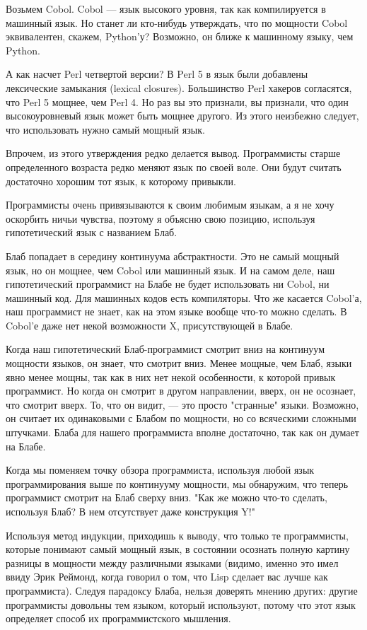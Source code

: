 \documentclass[ebook,12pt,oneside,openany]{memoir}
\begin{document}
Возьмем Cobol. Cobol — язык высокого уровня, так как компилируется в
машинный язык. Но станет ли кто-нибудь утверждать, что по мощности
Cobol эквивалентен, скажем, Python'у? Возможно, он ближе к машинному
языку, чем Python.

А как насчет Perl четвертой версии? В Perl 5 в язык были добавлены
лексические замыкания (lexical closures). Большинство Perl хакеров
согласятся, что Perl 5 мощнее, чем Perl 4. Но раз вы это признали, вы
признали, что один высокоуровневый язык может быть мощнее другого. Из
этого неизбежно следует, что использовать нужно самый мощный язык.

Впрочем, из этого утверждения редко делается вывод. Программисты
старше определенного возраста редко меняют язык по своей воле. Они
будут считать достаточно хорошим тот язык, к которому привыкли.

Программисты очень привязываются к своим любимым языкам, а я не хочу
оскорбить ничьи чувства, поэтому я объясню свою позицию, используя
гипотетический язык с названием Блаб.

Блаб попадает в середину континуума абстрактности. Это не самый мощный
язык, но он мощнее, чем Cobol или машинный язык. И на самом деле, наш
гипотетический программист на Блабе не будет использовать ни Cobol, ни
машинный код. Для машинных кодов есть компиляторы. Что же касается
Cobol'а, наш программист не знает, как на этом языке вообще что-то
можно сделать. В Cobol'е даже нет некой возможности X, присутствующей
в Блабе.

Когда наш гипотетический Блаб-программист смотрит вниз на континуум
мощности языков, он знает, что смотрит вниз. Менее мощные, чем Блаб,
языки явно менее мощны, так как в них нет некой особенности, к которой
привык программист. Но когда он смотрит в другом направлении, вверх,
он не осознает, что смотрит вверх. То, что он видит, — это просто
"странные" языки. Возможно, он считает их одинаковыми с Блабом по
мощности, но со всяческими сложными штучками. Блаба для нашего
программиста вполне достаточно, так как он думает на Блабе.

Когда мы поменяем точку обзора программиста, используя любой язык
программирования выше по континууму мощности, мы обнаружим, что теперь
программист смотрит на Блаб сверху вниз. "Как же можно что-то сделать,
используя Блаб? В нем отсутствует даже конструкция Y!"

Используя метод индукции, приходишь к выводу, что только те
программисты, которые понимают самый мощный язык, в состоянии осознать
полную картину разницы в мощности между различными языками (видимо,
именно это имел ввиду Эрик Реймонд, когда говорил о том, что Lisp
сделает вас лучше как программиста). Следуя парадоксу Блаба, нельзя
доверять мнению других: другие программисты довольны тем языком,
который используют, потому что этот язык определяет способ их
программистского мышления.
\end{document}
